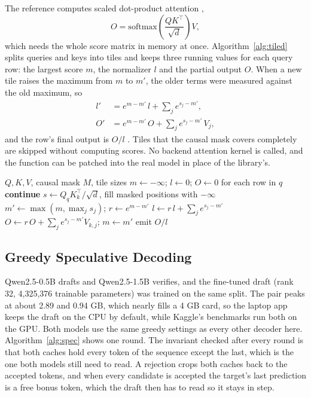 \documentclass[conference]{IEEEtran}
\begin{document}
The reference computes scaled dot-product attention \cite{vaswani2017attention},
\begin{equation}
O = \mathrm{softmax}\!\left(\frac{Q K^{\top}}{\sqrt{d}}\right) V,
\end{equation}
which needs the whole score matrix in memory at once. Algorithm~\ref{alg:tiled} splits queries and keys into tiles and keeps three running values for each query row: the largest score $m$, the normalizer $l$ and the partial output $O$. When a new tile raises the maximum from $m$ to $m'$, the older terms were measured against the old maximum, so
\begin{align}
l' &= e^{m-m'}\, l + \sum_j e^{s_j-m'},\\
O' &= e^{m-m'}\, O + \sum_j e^{s_j-m'}\, V_j,
\end{align}
and the row's final output is $O/l$ \cite{milakov2018online,dao2022flashattention}. Tiles that the causal mask covers completely are skipped without computing scores. No backend attention kernel is called, and the function can be patched into the real model in place of the library's.

\begin{algorithm}[t]
\caption{Tiled attention with online softmax}
\label{alg:tiled}
\footnotesize
\begin{algorithmic}[1]
\Require $Q, K, V$, causal mask $M$, tile sizes
  \State $m \gets -\infty$; $l \gets 0$; $O \gets 0$ for each row in $q$
     \textbf{continue} \EndIf
    \State $s \gets Q_q K_k^{\top}/\sqrt{d}$, fill masked positions with $-\infty$
    \State $m' \gets \max(m, \max_j s_j)$; $r \gets e^{m-m'}$
    \State $l \gets r\,l + \sum_j e^{s_j-m'}$
    \State $O \gets r\,O + \sum_j e^{s_j-m'} V_{k,j}$; $m \gets m'$
  \EndFor
  \State emit $O / l$
\EndFor
\end{algorithmic}
\end{algorithm}

\subsection{Greedy Speculative Decoding}

Qwen2.5-0.5B drafts and Qwen2.5-1.5B verifies, and the fine-tuned draft (rank 32, 4,325,376 trainable parameters) was trained on the same split. The pair peaks at about 2.89 and 0.94 GB, which nearly fills a 4 GB card, so the laptop app keeps the draft on the CPU by default, while Kaggle's benchmarks run both on the GPU. Both models use the same greedy settings as every other decoder here. Algorithm~\ref{alg:spec} shows one round. The invariant checked after every round is that both caches hold every token of the sequence except the last, which is the one both models still need to read. A rejection crops both caches back to the accepted tokens, and when every candidate is accepted the target's last prediction is a free bonus token, which the draft then has to read so it stays in step.
\end{document}
